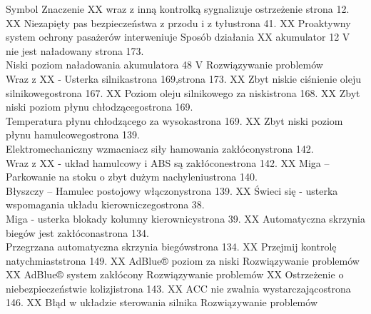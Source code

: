Symbol Znaczenie
XX	wraz z inną kontrolką sygnalizuje ostrzeżenie \guillemotright strona 12.
XX	Niezapięty pas bezpieczeństwa z przodu i z tyłu\guillemotright strona 41.
XX	Proaktywny system ochrony pasażerów interweniuje \guillemotright Sposób działania
XX	akumulator 12 V nie jest naładowany \guillemotright strona 173. \\ Niski poziom naładowania akumulatora 48 V \guillemotright Rozwiązywanie problemów \\ Wraz z XX - Usterka silnika\guillemotright strona 169,\guillemotright strona 173.
XX	Zbyt niskie ciśnienie oleju silnikowego\guillemotright strona 167.
XX	Poziom oleju silnikowego za niski\guillemotright strona 168.
XX	Zbyt niski poziom płynu chłodzącego\guillemotright strona 169. \\ Temperatura płynu chłodzącego za wysoka\guillemotright strona 169.
XX	Zbyt niski poziom płynu hamulcowego\guillemotright strona 139. \\ Elektromechaniczny wzmacniacz siły hamowania zakłócony\guillemotright strona 142. \\ Wraz z XX - układ hamulcowy i ABS są zakłócone\guillemotright strona 142.
XX	Miga -- Parkowanie na stoku o zbyt dużym nachyleniu\guillemotright strona 140. \\ Błyszczy -- Hamulec postojowy włączony\guillemotright strona 139.
XX	Świeci się - usterka wspomagania układu kierowniczego\guillemotright strona 38. \\ Miga - usterka blokady kolumny kierownicy\guillemotright strona 39.
XX	Automatyczna skrzynia biegów jest zakłócona\guillemotright strona 134. \\ Przegrzana automatyczna skrzynia biegów\guillemotright strona 134.
XX	Przejmij kontrolę natychmiast\guillemotright strona 149.
XX	AdBlue® poziom za niski \guillemotright Rozwiązywanie problemów
XX	AdBlue® system zakłócony \guillemotright Rozwiązywanie problemów
XX	Ostrzeżenie o niebezpieczeństwie kolizji\guillemotright strona 143.
XX	ACC nie zwalnia wystarczająco\guillemotright strona 146.
XX	Błąd w układzie sterowania silnika \guillemotright Rozwiązywanie problemów

